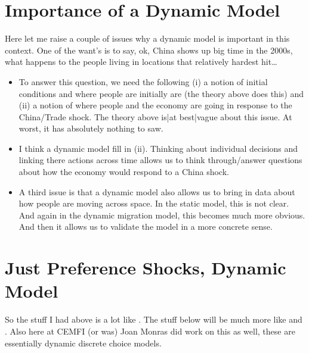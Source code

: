 \documentclass[pdftex,12pt]{article}
\begin{document}
\section{Importance of a Dynamic Model}

Here let me raise a couple of issues why a dynamic model is important in this context. One of the want's is to say, ok, China shows up big time in the 2000s, what happens to the people living in locations that relatively hardest hit\ldots
\begin{itemize}
\item To answer this question, we need the following (i) a notion of initial conditions and where people are initially are (the theory above does this) and (ii) a notion of where  people and the economy are going in response to the China/Trade shock. The theory above is|at best|vague about this issue. At worst, it has absolutely nothing to saw.

\item I think a dynamic model fill in (ii). Thinking about individual decisions and linking there actions across time allows us to think through/answer questions about how the economy would respond to a China shock.

\item A third issue is that a dynamic model also allows us to bring in data about how people are moving across space. In the static model, this is not clear. And again in the dynamic migration model, this becomes much more obvious. And then it allows us to validate the model in a more concrete sense.
\end{itemize}

\section{Just Preference Shocks, Dynamic Model}

So the stuff I had above is a lot like \citet{galle2015slicing}. The stuff below will be much more like \citet{caliendo2015trade} and \citet{artucc2010trade}. Also here at CEMFI (or was) Joan Monras did work on this as well, these are essentially dynamic discrete choice models.
\end{document}
